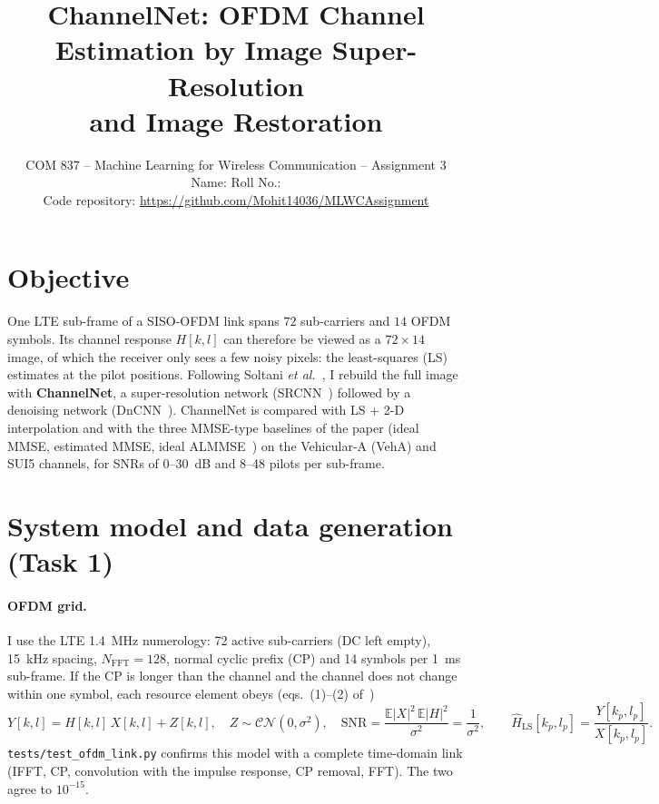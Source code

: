 \documentclass[10pt,a4paper]{article}
\title{\vspace{-1.2cm}\textbf{ChannelNet: OFDM Channel Estimation by Image Super-Resolution\\and Image Restoration}}
\author{COM 837 -- Machine Learning for Wireless Communication -- Assignment 3\\
Name: \studentname \qquad Roll No.: \rollno\\
Code repository: \url{https://github.com/Mohit14036/MLWCAssignment}}
\date{\vspace{-0.9cm}}
\newcommand{\code}[1]{\texttt{\small #1}}
\begin{document}
\maketitle

\section{Objective}

One LTE sub-frame of a SISO-OFDM link spans $72$ sub-carriers and $14$ OFDM symbols. Its channel
response $H[k,l]$ can therefore be viewed as a $72\times14$ image, of which the receiver only sees a
few noisy pixels: the least-squares (LS) estimates at the pilot positions. Following Soltani
\emph{et al.}~\cite{soltani}, I rebuild the full image with \textbf{ChannelNet}, a super-resolution
network (SRCNN~\cite{srcnn}) followed by a denoising network (DnCNN~\cite{dncnn}). ChannelNet is compared
with LS + 2-D interpolation and with the three MMSE-type baselines of the paper (ideal MMSE, estimated
MMSE, ideal ALMMSE~\cite{simko}) on the Vehicular-A (VehA) and SUI5 channels, for SNRs of 0--30~dB and
8--48 pilots per sub-frame.

\section{System model and data generation (Task 1)}

\paragraph{OFDM grid.} I use the LTE 1.4~MHz numerology: 72 active sub-carriers (DC left empty), 15~kHz
spacing, $N_{\mathrm{FFT}}=128$, normal cyclic prefix (CP) and 14 symbols per 1~ms sub-frame. If the
CP is longer than the channel and the channel does not change within one symbol, each resource element
obeys (eqs.~(1)--(2) of~\cite{soltani})
\begin{equation}
  Y[k,l] = H[k,l]\,X[k,l] + Z[k,l],\quad Z\sim\mathcal{CN}(0,\sigma^2),\quad
  \mathrm{SNR}=\frac{\mathbb{E}|X|^2\,\mathbb{E}|H|^2}{\sigma^2}=\frac{1}{\sigma^2},\qquad
  \hat H_{\mathrm{LS}}[k_p,l_p] = \frac{Y[k_p,l_p]}{X[k_p,l_p]}.
\end{equation}
\code{tests/test\_ofdm\_link.py} confirms this model with a complete time-domain link (IFFT, CP,
convolution with the impulse response, CP removal, FFT). The two agree to $10^{-15}$.
\end{document}
